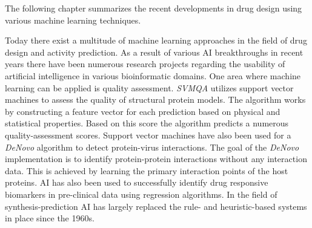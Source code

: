 The following chapter summarizes the recent developments in drug design using various machine 
learning techniques. 

Today there exist a multitude of machine learning approaches in the field of drug design and activity prediction.
As a result of various AI breakthroughs in recent years there have been numerous research projects regarding the usability of artificial intelligence
in various bioinformatic domains.
One area where machine learning can be applied is quality assessment.
\textit{SVMQA} utilizes support vector machines to assess the quality of structural protein models.
The algorithm works by constructing a feature vector for each prediction based on physical and statistical properties.
Based on this score the algorithm predicts a numerous quality-assessment scores\cite{Manavalan2017}.
Support vector machines have also been used for a \textit{DeNovo} algorithm to detect protein-virus interactions.
The goal of the \textit{DeNovo} implementation is to identify protein-protein interactions without any interaction data.
This is achieved by learning the primary interaction points of the host proteins\cite{Eid2016}.
AI has also been used to successfully identify drug responsive biomarkers in pre-clinical data using regression algorithms\cite{Li2015}.
In the field of synthesis-prediction AI has largely replaced the rule- and heuristic-based systems in place since the 1960s\cite{Johansson2019}.

